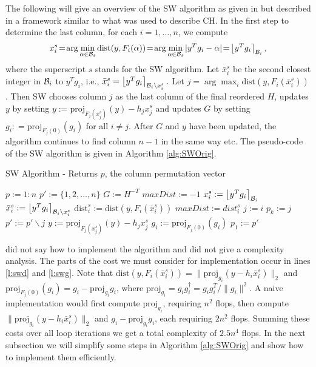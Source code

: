 \documentclass[conference]{IEEEtran}
\newcommand{\be}{\begin{equation}}
\newcommand{\ee}{\end{equation}}
\newcommand{\dist}{\mathrm{dist}}
\begin{document}
The following will give an overview of the SW algorithm as given in
\cite{SuW05} but described in a framework similar to what was used to describe
CH. In the first step to determine the last column, for each $i = 1, \dots, n$,
we compute 
\be
x_i^s \!=\! \arg\min_{\alpha\in {\cal B}_i}\dist(y,F_i(\alpha)) 
\!=\!  \arg\min _{\alpha\in {\cal B}_i}| y^Tg_i - \alpha | \!=\! \left \lfloor y^Tg_i \right \rceil_{{\cal B}_i},
\label{eq:xis}
\ee
where the superscript $s$  stands for the SW algorithm.
Let $\bar{x}_i^s$ be the second closest integer in ${{\cal B}_i }$ to $y^Tg_i$, i.e.,
$\bar{x}_i^s = \left \lfloor y^Tg_i \right \rceil_{{\cal B}_i\backslash x_i^s}.$
Let $j = \arg\max_i  \dist (y,F_i(\bar{x}_i^s))$. 
Then SW chooses column $j$ as the last column of the final reordered $H$,
 updates $y$ by setting 
$y:=\mbox{proj}_{F_j(x_j^s)}(y) -h_jx_j^s$  and 
updates $G$ by setting $ g_i: = \mbox{proj}_{F_j(0)}(g_i)$ for all $i\neq j$. 
After $G$ and $y$ have been updated, the algorithm continues to find column $n-1$ in the
same way etc. The pseudo-code of the SW algorithm is given in Algorithm \ref{alg:SWOrig}.
\begin{algorithm}
\caption{SW Algorithm - Returns $p$, the column permutation vector}
\label{alg:SWOrig}
\begin{algorithmic}[1]
\STATE $p := 1:n$
\STATE $p' := \{1, 2, \ldots, n\}$
\STATE \label{l:swG} $G := H^{-T}$ \hfill %
	\STATE $maxDist := -1$
		\STATE $x_i^s := \left \lfloor  y^Tg_i \right \rceil_{{\cal B }_i}$ \hfill%
		     \label{l:swx}
		\STATE $\bar{x}_i^s := \left \lfloor y^Tg_i \right \rceil_{{{\cal B }_i}{\backslash x_i^s}}$
		    \label{l:swbx}
		\STATE  \label{l:swd} $\dist_i^s := \dist(y,F_i(\bar{x}_i^s))$ %
			\STATE $maxDist := dist_i^s$
			\STATE $j := i$
		\ENDIF
	\ENDFOR
	\STATE $p_k := j$
	\STATE $p' := p' \backslash j$
	\STATE $y := \mbox{proj}_{F_j(x_j^s)}(y) -h_jx_j^s$  \label{l:swy}
		\STATE \label{l:swg} $g_i := \mbox{proj}_{F_j(0)}(g_i) $ %
	\ENDFOR
\ENDFOR
\STATE $p_1 := p'$
\end{algorithmic}
\end{algorithm}

 \cite{SuW05} did not say how to implement the algorithm and did not give a complexity analysis.
The parts of the cost we must consider for implementation occur in
lines \ref{l:swd} and \ref{l:swg}.
Note that $ \dist(y,F_i(\bar{x}_i^s))=\|\mbox{proj}_{g_i}(y-h_i\bar{x}_i^s)\|_2$
and $\mbox{proj}_{F_j(0)}(g_i)= g_i -\mbox{proj}_{g_i} g_i$,
where $\mbox{proj}_{g_i}=g_ig_i^\dag = g_ig_i^T/\|g_i\|^2$. 
A naive implementation would first compute $\mbox{proj}_{g_i}$, requiring $n^2$ flops, then compute 
$\|\mbox{proj}_{g_i}(y-h_i\bar{x}_i^s)\|_2$ and $g_i -\mbox{proj}_{g_i} g_i$, each requiring $2n^2$ flops.
Summing these costs over all loop iterations we get a total complexity of $2.5n^4$ flops.
In the next subsection we will simplify some steps in Algorithm \ref{alg:SWOrig}
and show how to  implement them efficiently.
\end{document}
